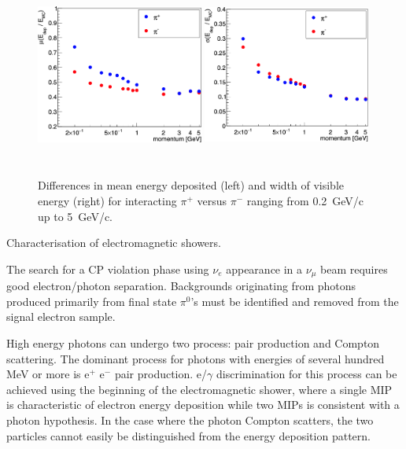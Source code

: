 \begin{description}
\begin{figure}[h!]
\includegraphics[width=0.49\textwidth,height=6.0cm]{figures/pipimean_ticks1}
\includegraphics[width=0.49\textwidth,height=6.0cm]{figures/pipisigma_ticks1}
  \caption{Differences in mean energy deposited (left) and width of visible energy (right) 
for interacting $\pi^+$ versus $\pi^-$ ranging from 0.2~GeV/c up to 5~GeV/c. 
}
\label{fig:pionshwr}
\end{figure}

\item Characterisation of electromagnetic showers.
\item [Study $e/\gamma$ separation capabilities]

The search for a CP violation phase using $\nu_e$ appearance 
in a $\nu_\mu$ beam requires good electron/photon separation.
Backgrounds originating from photons produced primarily from 
final state $\pi^0$'s must be identified and removed from the signal
electron sample. 

High energy photons can undergo two process: pair production and Compton scattering. 
The dominant process for photons with energies of several hundred MeV or more is 
e$^+$ e$^-$ pair production.
e/$\gamma$ discrimination
for this process can be achieved using the beginning of the electromagnetic shower, where 
a single MIP is characteristic of electron energy deposition while two MIPs is consistent 
with a photon hypothesis.
In the case where the photon Compton scatters, the two particles cannot easily be distinguished
from the energy deposition pattern.


\end{description}
